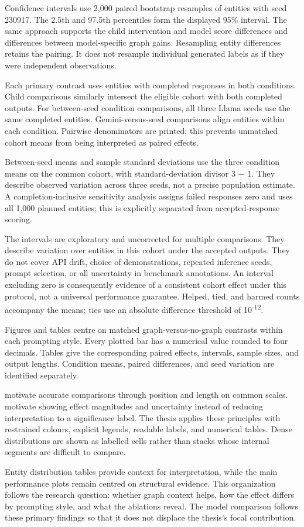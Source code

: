 Confidence intervals use 2,000 paired bootstrap resamples of entities with seed 230917. The 2.5th and 97.5th percentiles form the displayed 95\% interval. The same approach supports the child intervention and model score differences and differences between model-specific graph gains. Resampling entity differences retains the pairing. It does not resample individual generated labels as if they were independent observations.


Each primary contrast uses entities with completed responses in both conditions. Child comparisons similarly intersect the eligible cohort with both completed outputs. For between-seed condition comparisons, all three Llama seeds use the same completed entities. Gemini-versus-seed comparisons align entities within each condition. Pairwise denominators are printed; this prevents unmatched cohort means from being interpreted as paired effects.


Between-seed means and sample standard deviations use the three condition means on the common cohort, with standard-deviation divisor 3 \ensuremath{-} 1. They describe observed variation across three seeds, not a precise population estimate. A completion-inclusive sensitivity analysis assigns failed responses zero and uses all 1,000 planned entities; this is explicitly separated from accepted-response scoring.


The intervals are exploratory and uncorrected for multiple comparisons. They describe variation over entities in this cohort under the accepted outputs. They do not cover API drift, choice of demonstrations, repeated inference seeds, prompt selection, or all uncertainty in benchmark annotations. An interval excluding zero is consequently evidence of a consistent cohort effect under this protocol, not a universal performance guarantee. Helped, tied, and harmed counts accompany the means; ties use an absolute difference threshold of 10\textsuperscript{-12}.


Figures and tables centre on matched graph-versus-no-graph contrasts within each prompting style. Every plotted bar has a numerical value rounded to four decimals. Tables give the corresponding paired effects, intervals, sample sizes, and output lengths. Condition means, paired differences, and seed variation are identified separately.


\citet{cleveland1984} motivate accurate comparisons through position and length on common scales. \citet{ho2019} motivate showing effect magnitudes and uncertainty instead of reducing interpretation to a significance label. The thesis applies these principles with restrained colours, explicit legends, readable labels, and numerical tables. Dense distributions are shown as labelled cells rather than stacks whose internal segments are difficult to compare.


Entity distribution tables provide context for interpretation, while the main performance plots remain centred on structural evidence. This organization follows the research question: whether graph context helps, how the effect differs by prompting style, and what the ablations reveal. The model comparison follows these primary findings so that it does not displace the thesis’s focal contribution.

